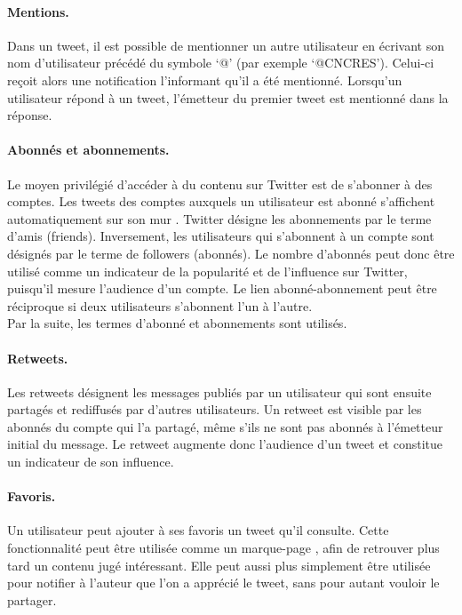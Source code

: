         \paragraph{Mentions.}
        Dans un tweet, il est possible de mentionner un autre utilisateur en écrivant son nom d’utilisateur précédé du symbole ‘@’ (par exemple ‘@CNCRES’). Celui-ci reçoit alors une notification l’informant qu’il a été mentionné. Lorsqu’un utilisateur répond à un tweet, l’émetteur du premier tweet est mentionné dans la réponse.

        \paragraph{Abonnés et abonnements.}
        Le moyen privilégié d’accéder à du contenu sur Twitter est de s’abonner à des comptes. Les tweets des comptes auxquels un utilisateur est abonné s’affichent automatiquement sur son  \og mur  \fg{}. Twitter désigne les abonnements par le terme  \og d’amis  \fg{} (friends). Inversement, les utilisateurs qui s’abonnent à un compte sont désignés par le terme de  \og followers  \fg{} (abonnés). Le nombre d’abonnés peut donc être utilisé comme un indicateur de la popularité et de l’influence sur Twitter, puisqu’il mesure l’audience d’un compte. Le lien abonné-abonnement peut être réciproque si deux utilisateurs s’abonnent l’un à l’autre. \\
        Par la suite, les termes  \og d’abonné  \fg{} et  \og abonnements  \fg{} sont utilisés.

        \paragraph{Retweets.}
        Les retweets désignent les messages publiés par un utilisateur qui sont ensuite partagés et rediffusés par d’autres utilisateurs. Un retweet est visible par les abonnés du compte qui l’a partagé, même s’ils ne sont pas abonnés à l’émetteur initial du message. Le retweet augmente donc l’audience d’un tweet et constitue un indicateur de son influence.

        \paragraph{Favoris.}
        Un utilisateur peut ajouter à ses favoris un tweet qu’il consulte. Cette fonctionnalité peut être utilisée comme un  \og marque-page  \fg{}, afin de retrouver plus tard un contenu jugé intéressant. Elle peut aussi plus simplement être utilisée pour notifier à l’auteur que l’on a apprécié le tweet, sans pour autant vouloir le partager.

